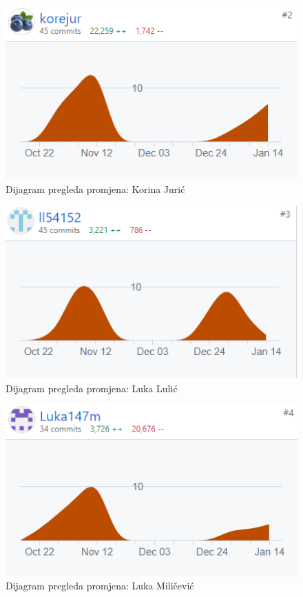 		\begin{figure}
			\centering
			\includegraphics[width=0.8\linewidth]{slike/graf_kore.png}
			\caption{Dijagram pregleda promjena: Korina Jurić}
			\label{fig:graf_kore}
		\end{figure}
		
		\begin{figure}
			\centering
			\includegraphics[width=0.8\linewidth]{slike/graf_lula.png}
			\caption{Dijagram pregleda promjena: Luka Lulić}
			\label{fig:graf_lula}
		\end{figure}
		
		\begin{figure}
			\centering
			\includegraphics[width=0.8\linewidth]{slike/graf_luka.png}
			\caption{Dijagram pregleda promjena: Luka Miličević}
			\label{fig:graf_luka}
		\end{figure}
		
